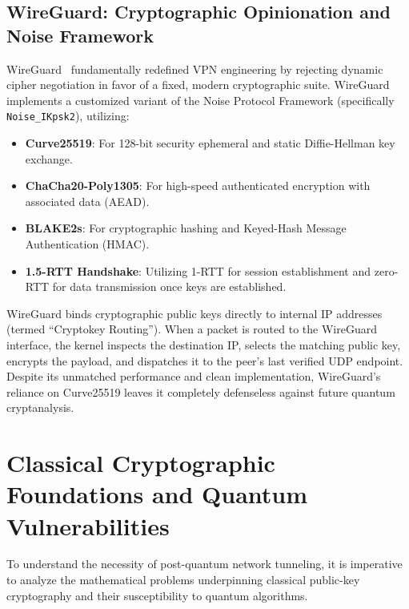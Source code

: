 \subsection{WireGuard: Cryptographic Opinionation and Noise Framework}
WireGuard~\cite{donenfeld2017wireguard} fundamentally redefined VPN engineering by rejecting dynamic cipher negotiation in favor of a fixed, modern cryptographic suite. WireGuard implements a customized variant of the Noise Protocol Framework (specifically \texttt{Noise\_IKpsk2}), utilizing:
\begin{itemize}
    \item \textbf{Curve25519}: For 128-bit security ephemeral and static Diffie-Hellman key exchange.
    \item \textbf{ChaCha20-Poly1305}: For high-speed authenticated encryption with associated data (AEAD).
    \item \textbf{BLAKE2s}: For cryptographic hashing and Keyed-Hash Message Authentication (HMAC).
    \item \textbf{1.5-RTT Handshake}: Utilizing 1-RTT for session establishment and zero-RTT for data transmission once keys are established.
\end{itemize}

WireGuard binds cryptographic public keys directly to internal IP addresses (termed ``Cryptokey Routing''). When a packet is routed to the WireGuard interface, the kernel inspects the destination IP, selects the matching public key, encrypts the payload, and dispatches it to the peer's last verified UDP endpoint. Despite its unmatched performance and clean implementation, WireGuard's reliance on Curve25519 leaves it completely defenseless against future quantum cryptanalysis.

\section{Classical Cryptographic Foundations and Quantum Vulnerabilities}
\label{sec:classical_crypto_quantum}

To understand the necessity of post-quantum network tunneling, it is imperative to analyze the mathematical problems underpinning classical public-key cryptography and their susceptibility to quantum algorithms.


